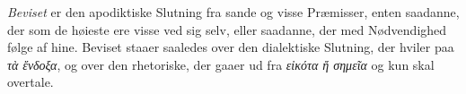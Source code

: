 \documentclass[12pt,a4paper]{book}
\newcommand{\gk}[1]{\textit{#1}}
\begin{document}
\emph{Beviset} er den apodiktiske Slutning fra sande og visse
Præmisser, enten saadanne, der som de høieste ere visse ved
sig selv, eller saadanne, der med Nødvendighed følge af hine.
Beviset staaer saaledes over den dialektiske Slutning, der hviler
paa \gk{τὰ ἔνδοξα}, og over den rhetoriske, der gaaer ud fra
\gk{εἰκότα ἤ σημεῖα} og kun skal overtale.
\end{document}
